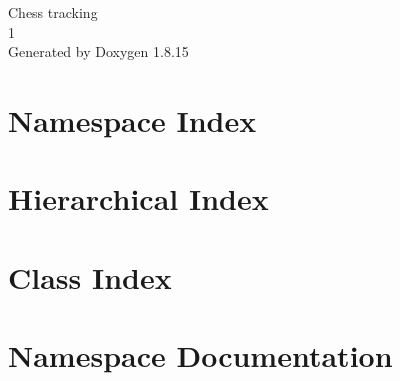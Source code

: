 \let\mypdfximage\pdfximage\def\pdfximage{\immediate\mypdfximage}\documentclass[twoside]{book}
\newcommand{\+}{\discretionary{\mbox{\scriptsize$\hookleftarrow$}}{}{}}
\newcommand{\clearemptydoublepage}{%
  \newpage{\pagestyle{empty}\cleardoublepage}%
}
\begin{document}
\hypersetup{pageanchor=false,
             bookmarksnumbered=true,
             pdfencoding=unicode
            }
\begin{titlepage}
\vspace*{7cm}
\begin{center}%
{\Large Chess tracking \\[1ex]\large 1 }\\
\vspace*{1cm}
{\large Generated by Doxygen 1.8.15}\\
\end{center}
\end{titlepage}
\clearemptydoublepage
{}
\tableofcontents
\clearemptydoublepage
{}
\hypersetup{pageanchor=true}

\chapter{Namespace Index}

\chapter{Hierarchical Index}

\chapter{Class Index}

\chapter{Namespace Documentation}





















\end{document}
